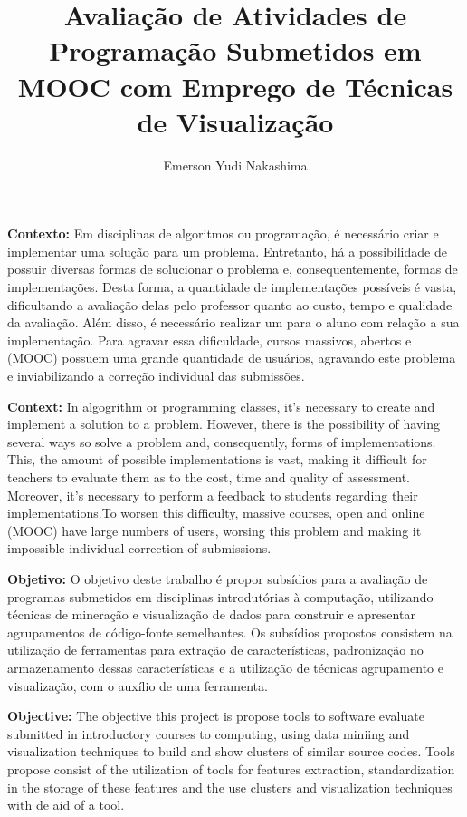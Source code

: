 \documentclass[12pt,english,brazil,a4paper,utf8,oneside]{utfpr-tcc}
\author{Emerson Yudi Nakashima}  %
\title{Avaliação de Atividades de Programação Submetidos em MOOC com Emprego de Técnicas de Visualização} %
\begin{document}
	
\frontmatter
\maketitle

\begin{resumo}
\textbf{Contexto:} Em disciplinas de algoritmos ou programação, é necessário criar
e implementar uma solução para um problema. Entretanto, há a possibilidade de possuir
diversas formas de solucionar o problema e, consequentemente, formas de implementações.
Desta forma, a quantidade de implementações possíveis é vasta, dificultando a avaliação
delas pelo professor quanto ao custo, tempo e qualidade da avaliação. Além disso, é
necessário realizar um  para o aluno com relação a sua implementação.
Para agravar essa dificuldade, cursos massivos, abertos e  (MOOC)
possuem uma grande quantidade de usuários, agravando este problema e inviabilizando
a correção individual das submissões.

\textbf{Context:} In algogrithm or programming classes, it's necessary to create and
implement a solution to a problem. However, there is the possibility of having several
ways so solve a problem and, consequently, forms of implementations. This, the amount
of possible implementations is vast, making it difficult for teachers to evaluate them
as to the cost, time and quality of assessment. Moreover, it's necessary to perform a
feedback to students regarding their implementations.To worsen this difficulty,
massive courses, open and online (\acs{MOOC}) have large numbers of users, worsing this
problem and making it impossible individual correction of submissions.

\textbf{Objetivo:} O objetivo deste trabalho é propor subsídios para a avaliação de
programas submetidos em disciplinas introdutórias à computação, utilizando técnicas
de mineração e visualização de dados para construir e apresentar agrupamentos de
código-fonte semelhantes. Os subsídios propostos consistem na utilização de ferramentas
para extração de características, padronização no armazenamento dessas características
e a utilização de técnicas agrupamento e visualização, com o auxílio de uma ferramenta.

\textbf{Objective:} The objective this project is propose tools to software evaluate
submitted in introductory courses to computing, using data miniing and visualization
techniques to build and show clusters of similar source codes. Tools propose consist
of the utilization of tools for features extraction, standardization in the storage
of these features and the use clusters and visualization techniques with de aid of
a tool.


\end{resumo}
\end{document}
